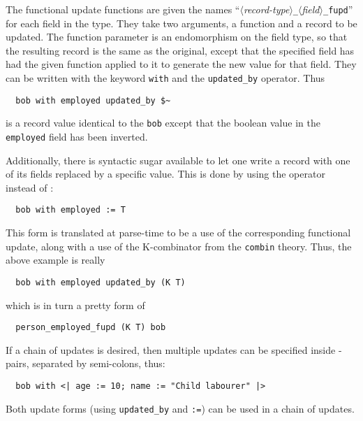 The functional update functions are given the names
\mbox{``$\langle$\textsl{record-type}$\rangle$\texttt{\_}$\langle$\textsl{field}$\rangle$\texttt{\_fupd}''} 
for each field in
the type.  They take two arguments, a function and a record to be
updated.  The function parameter is an endomorphism on the field type,
so that the resulting record is the same as the original, except that
the specified field has had the given function applied to it to
generate the new value for that field.  They can be written with the
keyword \texttt{with} and the \texttt{updated\_by} operator.  Thus
%
\begin{hol}
\begin{verbatim}
  bob with employed updated_by $~
\end{verbatim} 
\end{hol}\noindent
%
is a record value identical to the \texttt{bob} except that the
boolean value in the \texttt{employed} field has been inverted.

Additionally, there is syntactic sugar available to let one write a
record with one of its fields replaced by a specific value.  This is
done by using the \holtxt{:=} operator instead of
:
%
\begin{hol}
\begin{verbatim}
  bob with employed := T
\end{verbatim}
\end{hol}
%
This form is translated at parse-time to be a use of the corresponding
functional update, along with a use of the \textsf{K}-combinator from
the \texttt{combin} theory.  Thus, the above example  is really
%
\begin{hol}
\begin{verbatim}
  bob with employed updated_by (K T)
\end{verbatim}
\end{hol}
%
which is in turn a pretty form of
%
\begin{hol}
\begin{verbatim}
  person_employed_fupd (K T) bob
\end{verbatim}
\end{hol}
%
If a chain of updates is desired, then multiple updates can be
specified inside \holtxt{<|}-\holtxt{|>} pairs, separated by
semi-colons, thus:
%
\begin{hol}
\begin{verbatim}
  bob with <| age := 10; name := "Child labourer" |>
\end{verbatim}
\end{hol}
%
Both update forms (using \texttt{updated\_by} and \texttt{:=}) can be
used in a chain of updates.


